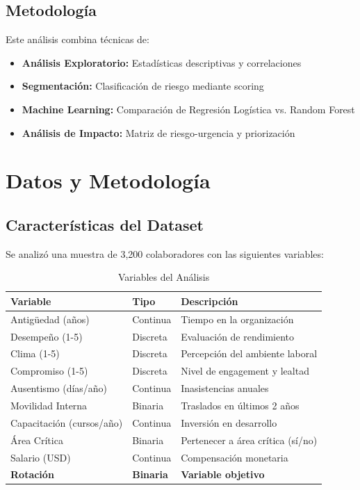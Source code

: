 \documentclass[11pt,a4paper,twoside]{article}
\begin{document}
\subsection{Metodología}

Este análisis combina técnicas de:

\begin{itemize}
    \item \textbf{Análisis Exploratorio:} Estadísticas descriptivas y correlaciones
    \item \textbf{Segmentación:} Clasificación de riesgo mediante scoring
    \item \textbf{Machine Learning:} Comparación de Regresión Logística vs. Random Forest
    \item \textbf{Análisis de Impacto:} Matriz de riesgo-urgencia y priorización
\end{itemize}

\newpage

\section{Datos y Metodología}

\subsection{Características del Dataset}

Se analizó una muestra de 3,200 colaboradores con las siguientes variables:

\begin{table}[H]
    \centering
    \caption{Variables del Análisis}
    \begin{tabular}{|l|l|p{6cm}|}
        \toprule
        \textbf{Variable} & \textbf{Tipo} & \textbf{Descripción} \\
        \midrule
        Antigüedad (años) & Continua & Tiempo en la organización \\
        Desempeño (1-5) & Discreta & Evaluación de rendimiento \\
        Clima (1-5) & Discreta & Percepción del ambiente laboral \\
        Compromiso (1-5) & Discreta & Nivel de engagement y lealtad \\
        Ausentismo (días/año) & Continua & Inasistencias anuales \\
        Movilidad Interna & Binaria & Traslados en últimos 2 años \\
        Capacitación (cursos/año) & Continua & Inversión en desarrollo \\
        Área Crítica & Binaria & Pertenecer a área crítica (sí/no) \\
        Salario (USD) & Continua & Compensación monetaria \\
        \textbf{Rotación} & \textbf{Binaria} & \textbf{Variable objetivo} \\
        \bottomrule
    \end{tabular}
\end{table}
\end{document}
